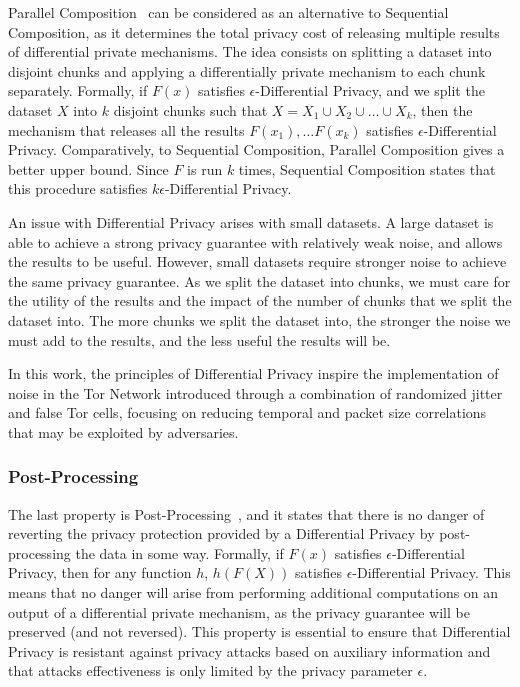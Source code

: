 Parallel Composition~\cite{DP_Book, AlgFoundationsDP} can be considered as an alternative to Sequential Composition, as it determines the total privacy cost of releasing multiple results of differential private mechanisms. The idea consists on splitting a dataset into disjoint chunks and applying a differentially private mechanism to each chunk separately. Formally, if \(F(x)\) satisfies \(\epsilon\)-Differential Privacy, and we split the dataset \(X\) into \(k\) disjoint chunks such that \(X = X_1 \cup X_2 \cup \ldots \cup X_k\), then the mechanism that releases all the results \(F(x_1), \ldots F(x_k)\) satisfies \(\epsilon\)-Differential Privacy. Comparatively, to Sequential Composition, Parallel Composition gives a better upper bound. Since \(F\) is run \(k\) times, Sequential Composition states that this procedure satisfies \(k\epsilon\)-Differential Privacy.

An issue with Differential Privacy arises with small datasets. A large dataset is able to achieve a strong privacy guarantee with relatively weak noise, and allows the results to be useful. However, small datasets require stronger noise to achieve the same privacy guarantee.
As we split the dataset into chunks, we must care for the utility of the results and the impact of the number of chunks that we split the dataset into. The more chunks we split the dataset into, the stronger the noise we must add to the results, and the less useful the results will be.

In this work, the principles of Differential Privacy inspire the implementation of noise in the Tor Network introduced through a combination of randomized jitter and false Tor cells, focusing on reducing temporal and packet size correlations that may be exploited by adversaries.

\subsubsection{Post-Processing}\label{subsubsec:post_processing}

The last property is Post-Processing~\cite{DP_Book, AlgFoundationsDP}, and it states that there is no danger of reverting the privacy protection provided by a Differential Privacy by post-processing the data in some way. Formally, if \(F(x)\) satisfies \(\epsilon\)-Differential Privacy, then for any function \(h\), \(h(F(X))\) satisfies \(\epsilon\)-Differential Privacy. This means that no danger will arise from performing additional computations on an output of a differential private mechanism, as the privacy guarantee will be preserved (and not reversed). This property is essential to ensure that Differential Privacy is resistant against privacy attacks based on auxiliary information and that attacks effectiveness is only limited by the privacy parameter \(\epsilon\).

